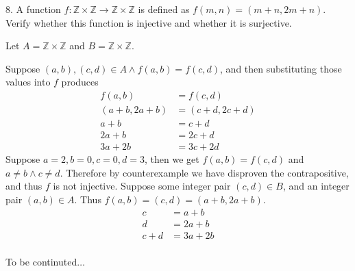 \documentclass{article}
\begin{document}
\begin{exercise}{}{}
	{8. A function $f: \mathbb{Z} \times \mathbb{Z} \rightarrow
			\mathbb{Z} \times \mathbb{Z}$ is defined as \mbox{$f(m, n)=(m+n, 2 m+n)$}. Verify
		whether this function is injective and whether it is surjective.}
	\begin{alist}
		\item Let $A=\mathbb{Z}\times\mathbb{Z}$ and $B=\mathbb{Z}\times\mathbb{Z}$.
		\item Suppose $(a, b), (c, d) \in A \land f(a, b)=f(c, d)$, and then
		substituting those values into $f$ produces
		\begin{align*}
			f(a, b)     & =f(c, d)     \\
			(a+b, 2a+b) & =(c+d, 2c+d) \\
			a+b         & =c+d         \\
			2a+b        & =2c+d        \\
			3a+2b       & = 3c+2d
		\end{align*}
		Suppose $a=2, b=0, c=0, d=3$, then we get $f(a, b)=f(c, d)$ and $a\neq b \land
			c\neq d$. Therefore by counterexample we have disproven the contrapositive, and
		thus $f$ is not injective.
		Suppose some integer pair $(c, d)\in B$, and an integer pair $(a, b)\in
			A$. Thus $f(a, b)=(c, d)=(a+b, 2a+b)$.
		\begin{align*}
			c   & =a+b   \\
			d   & =2a+b  \\
			c+d & =3a+2b \\
		\end{align*}
		\item To be continuted$\dots$
	\end{alist}
\end{exercise}{}{}
\end{document}
